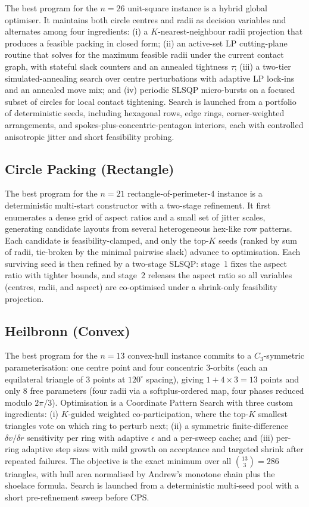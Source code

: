 The best program for the $n{=}26$ unit-square instance is a hybrid global
optimiser. It maintains both circle centres and radii as decision variables
and alternates among four ingredients: (i) a $K$-nearest-neighbour radii
projection that produces a feasible packing in closed form; (ii) an
active-set LP cutting-plane routine that solves for the maximum feasible
radii under the current contact graph, with stateful slack counters and an
annealed tightness $\tau$; (iii) a two-tier simulated-annealing search over
centre perturbations with adaptive LP lock-ins and an annealed move mix;
and (iv) periodic SLSQP micro-bursts on a focused subset of circles for
local contact tightening. Search is launched from a portfolio of
deterministic seeds, including hexagonal rows, edge rings, corner-weighted
arrangements, and spokes-plus-concentric-pentagon interiors, each with
controlled anisotropic jitter and short feasibility probing.

\subsection{Circle Packing (Rectangle)}
\label{app:program:cprr}

The best program for the $n{=}21$ rectangle-of-perimeter-$4$ instance is a
deterministic multi-start constructor with a two-stage refinement. It first
enumerates a dense grid of aspect ratios and a small set of jitter scales,
generating candidate layouts from several heterogeneous hex-like row
patterns. Each candidate is feasibility-clamped, and only the top-$K$ seeds
(ranked by sum of radii, tie-broken by the minimal pairwise slack) advance
to optimisation. Each surviving seed is then refined by a two-stage SLSQP:
stage~1 fixes the aspect ratio with tighter bounds, and stage~2 releases the
aspect ratio so all variables (centres, radii, and aspect) are co-optimised
under a shrink-only feasibility projection.

\subsection{Heilbronn (Convex)}
\label{app:program:h13}

The best program for the $n{=}13$ convex-hull instance commits to a
$C_3$-symmetric parameterisation: one centre point and four concentric
$3$-orbits (each an equilateral triangle of $3$ points at $120^{\circ}$
spacing), giving $1{+}4{\times}3=13$ points and only $8$ free parameters
(four radii via a softplus-ordered map, four phases reduced modulo
$2\pi/3$). Optimisation is a Coordinate Pattern Search with three custom
ingredients: (i) $K$-guided weighted co-participation, where the top-$K$
smallest triangles vote on which ring to perturb next; (ii) a symmetric
finite-difference $\delta v / \delta r$ sensitivity per ring with adaptive
$\epsilon$ and a per-sweep cache; and (iii) per-ring adaptive step sizes
with mild growth on acceptance and targeted shrink after repeated failures.
The objective is the exact minimum over all $\binom{13}{3}=286$ triangles,
with hull area normalised by Andrew's monotone chain plus the shoelace
formula. Search is launched from a deterministic multi-seed pool with a
short pre-refinement sweep before CPS.


